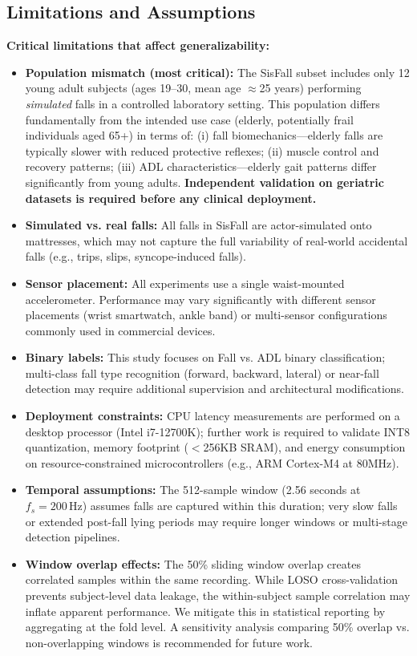 \documentclass{article}
\begin{document}
\subsection{Limitations and Assumptions}

\textbf{Critical limitations that affect generalizability:}

\begin{itemize}
    \item \textbf{Population mismatch (most critical):} The SisFall subset includes only 12 young adult subjects (ages 19--30, mean age $\approx$25 years) performing \textit{simulated} falls in a controlled laboratory setting. This population differs fundamentally from the intended use case (elderly, potentially frail individuals aged 65+) in terms of: (i) fall biomechanics---elderly falls are typically slower with reduced protective reflexes; (ii) muscle control and recovery patterns; (iii) ADL characteristics---elderly gait patterns differ significantly from young adults. \textbf{Independent validation on geriatric datasets is required before any clinical deployment.}
    \item \textbf{Simulated vs. real falls:} All falls in SisFall are actor-simulated onto mattresses, which may not capture the full variability of real-world accidental falls (e.g., trips, slips, syncope-induced falls).
    \item \textbf{Sensor placement:} All experiments use a single waist-mounted accelerometer. Performance may vary significantly with different sensor placements (wrist smartwatch, ankle band) or multi-sensor configurations commonly used in commercial devices.
    \item \textbf{Binary labels:} This study focuses on Fall vs. ADL binary classification; multi-class fall type recognition (forward, backward, lateral) or near-fall detection may require additional supervision and architectural modifications.
    \item \textbf{Deployment constraints:} CPU latency measurements are performed on a desktop processor (Intel i7-12700K); further work is required to validate INT8 quantization, memory footprint ($<$256KB SRAM), and energy consumption on resource-constrained microcontrollers (e.g., ARM Cortex-M4 at 80MHz).
    \item \textbf{Temporal assumptions:} The 512-sample window (2.56 seconds at $f_s=200\,\mathrm{Hz}$) assumes falls are captured within this duration; very slow falls or extended post-fall lying periods may require longer windows or multi-stage detection pipelines.
    \item \textbf{Window overlap effects:} The 50\% sliding window overlap creates correlated samples within the same recording. While LOSO cross-validation prevents subject-level data leakage, the within-subject sample correlation may inflate apparent performance. We mitigate this in statistical reporting by aggregating at the fold level. A sensitivity analysis comparing 50\% overlap vs. non-overlapping windows is recommended for future work.
\end{itemize}
\end{document}
